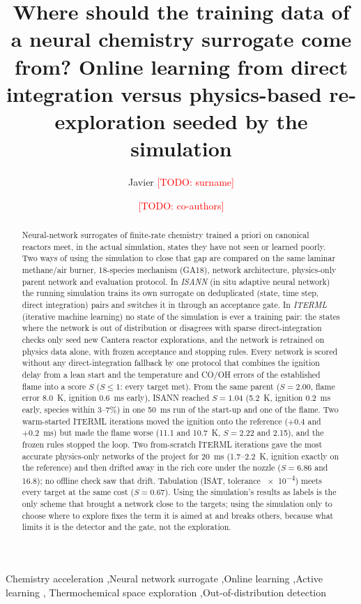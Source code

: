 \documentclass[preprint,review,12pt]{elsarticle}
\newcommand{\todo}[1]{\textcolor{red}{[TODO: #1]}}
\begin{document}
\begin{frontmatter}

\title{Where should the training data of a neural chemistry surrogate come from? Online learning from
direct integration versus physics-based re-exploration seeded by the simulation}

\author[a]{Javier \todo{surname}}
\author[a]{\todo{co-authors}}
\address[a]{\todo{affiliation}}

\begin{abstract}
Neural-network surrogates of finite-rate chemistry trained a priori on canonical reactors meet, in the
actual simulation, states they have not seen or learned poorly. Two ways of using the simulation to close
that gap are compared on the same laminar methane/air burner, 18-species mechanism (GA18), network
architecture, physics-only parent network and evaluation protocol. In \emph{ISANN} (in situ adaptive
neural network) the running simulation trains its own surrogate on deduplicated (state, time step, direct
integration) pairs and switches it in through an acceptance gate. In \emph{ITERML} (iterative machine
learning) no state of the simulation is ever a training pair: the states where the network is out of
distribution or disagrees with sparse direct-integration checks only seed new Cantera reactor
explorations, and the network is retrained on physics data alone, with frozen acceptance and stopping
rules. Every network is scored without any direct-integration fallback by one protocol that combines
the ignition delay from a lean start and the temperature and CO/OH errors of the established flame into a
score $S$ ($S\le1$: every target met). From the same parent ($S=2.00$, flame error 8.0~K, ignition 0.6~ms
early), ISANN reached $S=1.04$ (5.2~K, ignition 0.2~ms early, species within 3--7\%) in one 50~ms run of
the start-up and one of the flame. Two warm-started ITERML iterations moved the ignition onto the
reference ($+0.4$ and $+0.2$~ms) but made the flame worse (11.1 and 10.7~K, $S=2.22$ and 2.15), and the
frozen rules stopped the loop. Two from-scratch ITERML iterations gave the most accurate physics-only
networks of the project for 20~ms (1.7--2.2~K, ignition exactly on the reference) and then drifted away in
the rich core under the nozzle ($S=6.86$ and 16.8); no offline check saw that drift. Tabulation (ISAT,
tolerance \num{e-4}) meets every target at the same cost ($S=0.67$). Using the simulation's results as
labels is the only scheme that brought a network close to the targets; using the simulation only to choose
where to explore fixes the term it is aimed at and breaks others, because what limits it is the detector
and the gate, not the exploration.
\end{abstract}

\begin{keyword}
Chemistry acceleration \sep Neural network surrogate \sep Online learning \sep Active learning \sep
Thermochemical space exploration \sep Out-of-distribution detection
\end{keyword}
\end{frontmatter}
\end{document}
